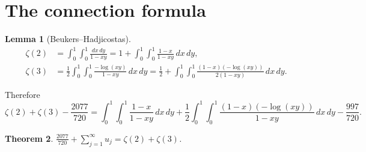 \documentclass[11pt]{article}
\newtheorem{theorem}{Theorem}
\newtheorem{lemma}[theorem]{Lemma}
\begin{document}
\section{The connection formula}

\begin{lemma}[Beukers--Hadjicostas]
\begin{align}
\zeta(2) &= \int_0^1 \int_0^1 \frac{dx\,dy}{1 - xy}
  = 1 + \int_0^1 \int_0^1 \frac{1-x}{1-xy}\,dx\,dy, \\
\zeta(3) &= \frac{1}{2} \int_0^1 \int_0^1
  \frac{-\log(xy)}{1-xy}\,dx\,dy
  = \frac{1}{2} + \int_0^1 \int_0^1
  \frac{(1-x)(-\log(xy))}{2(1-xy)}\,dx\,dy.
\end{align}
\end{lemma}

Therefore
\begin{equation}\label{eq:target}
\zeta(2) + \zeta(3) - \frac{2077}{720}
= \int_0^1 \int_0^1 \frac{1-x}{1-xy}\,dx\,dy
+ \frac{1}{2}\int_0^1 \int_0^1
  \frac{(1-x)(-\log(xy))}{1-xy}\,dx\,dy
- \frac{997}{720}.
\end{equation}

\begin{theorem}
$\displaystyle\frac{2077}{720} + \sum_{j=1}^{\infty} u_j
= \zeta(2) + \zeta(3)$.
\end{theorem}
\end{document}
